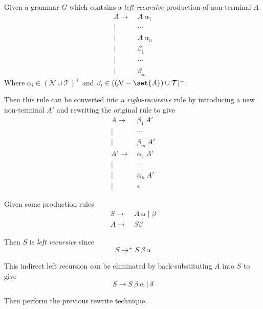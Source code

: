 \begin{definition}
    Given a grammar $G$ which contains a \textit{left-recursive} production of non-terminal $A$
    \begin{equation}
        \begin{aligned}
            A \to  &\ A\ \alpha_1 \\
              \mid &\ \cdots \\
              \mid &\ A\ \alpha_n \\
              \mid &\ \beta_1 \\
              \mid &\ \cdots \\
              \mid &\ \beta_m
        \end{aligned}
    \end{equation}
    Where $\alpha_i \in (\mathcal{N} \cup \mathcal{T})^+$ and $\beta_i \in ((\mathcal{N} - \set{A}) \cup \mathcal{T})^+$.
    
    Then this rule can be converted into a \textit{right-recursive} rule by introducing a new non-terminal $A\prime$ and rewriting the original rule to give
    \begin{equation}
        \begin{aligned}
        A \to  &\ \beta_1\ A\prime \\
          \mid &\ \cdots \\
          \mid &\ \beta_m\ A\prime \\
        A\prime \to  &\ \alpha_1\ A\prime \\
                \mid &\ \cdots \\
                \mid &\ \alpha_n\ A\prime \\
                \mid &\ \varepsilon
        \end{aligned}
    \end{equation}
\end{definition}

\begin{definition}
    Given some production rules
    \begin{equation}
        \begin{aligned}
            S \to &\ A\ \alpha \mid \beta \\
            A \to &\ S \beta
        \end{aligned}
    \end{equation}
    
    Then $S$ is \textit{left recursive} since
    \begin{equation}
        S \to^+ S\ \beta\ \alpha
    \end{equation}
    
    This indirect left recursion can be eliminated by back-substituting $A$ into $S$ to give
    \begin{equation}
        S \to S\ \beta\ \alpha \mid \delta
    \end{equation}
    
    Then perform the previous rewrite technique.
\end{definition}

